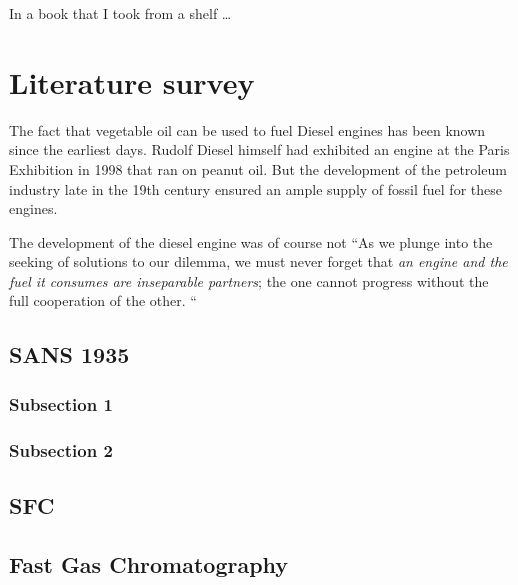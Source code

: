 
\begin{savequote}[45mm]
In a book that I took from a shelf \ldots
{}
\end{savequote}


\chapter{Literature survey} %

\label{Chapter3} %

The fact that vegetable oil can be used to fuel Diesel engines has been known
since the earliest days. Rudolf Diesel himself had exhibited an engine at the
Paris Exhibition in 1998  that ran on peanut
oil. But the development of the petroleum industry late in the 19th century
ensured an ample supply of fossil fuel for these engines.

The development of the diesel engine was of course not ``As we plunge into the seeking of
solutions to our dilemma, we must never forget that \textit{an engine and the
fuel it consumes are inseparable partners}; the one cannot progress without the
full cooperation of the other. `` 



\section{SANS 1935}

\subsection{Subsection 1}

\subsection{Subsection 2}

\section{SFC}

\section{Fast Gas Chromatography}

